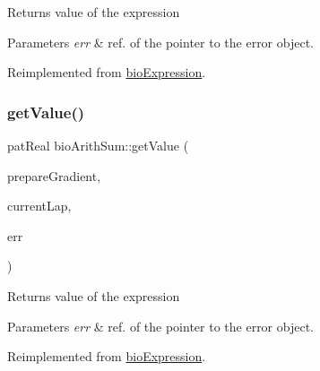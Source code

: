 \begin{DoxyReturn}{Returns}
value of the expression 
\end{DoxyReturn}

\begin{DoxyParams}{Parameters}
{\em err} & ref. of the pointer to the error object. \\
\hline
\end{DoxyParams}


Reimplemented from \hyperlink{classbio_expression_af58662a5d4d456f15bc4f2c9bd4f8a5b}{bio\+Expression}.

\mbox{\label{classbio_arith_sum_a96362470d300fec04262c86df3864190}} 
\subsubsection{\texorpdfstring{get\+Value()}{getValue()}\hspace{0.1cm}{\footnotesize\ttfamily [2/4]}}
{\footnotesize\ttfamily pat\+Real bio\+Arith\+Sum\+::get\+Value (\begin{DoxyParamCaption}\item[{pat\+Boolean}]{prepare\+Gradient,  }\item[{pat\+U\+Long}]{current\+Lap,  }\item[{pat\+Error $\ast$\&}]{err }\end{DoxyParamCaption})\hspace{0.3cm}{\ttfamily [virtual]}}

\begin{DoxyReturn}{Returns}
value of the expression 
\end{DoxyReturn}

\begin{DoxyParams}{Parameters}
{\em err} & ref. of the pointer to the error object. \\
\hline
\end{DoxyParams}


Reimplemented from \hyperlink{classbio_expression_af58662a5d4d456f15bc4f2c9bd4f8a5b}{bio\+Expression}.

\mbox{\label{classbio_arith_sum_a3705cb2f1aebf4541131df5638a33379}} 
